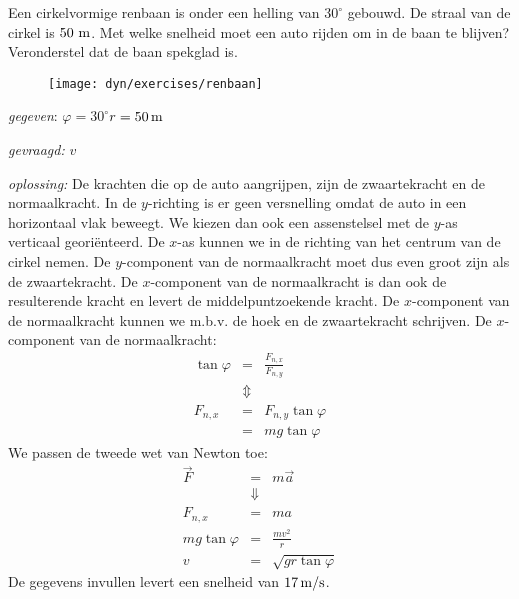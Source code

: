 \documentclass{ximera}
\begin{document}
\begin{exercise} Een cirkelvormige renbaan is onder een helling van $30^\circ$
gebouwd. De straal van de cirkel is $50~\rm m$. Met welke snelheid
moet een auto rijden om in de baan te blijven? Veronderstel dat de
baan spekglad is. 
\begin{oplossing}
\begin{figure}[h]
\centering\texttt{[image: dyn/exercises/renbaan]}
\end{figure}


\textit{gegeven}: $\varphi=30^\circ$\newline$r=50\rm\,m$

\textit{gevraagd:} $v$

\textit{oplossing:} De krachten die op de auto aangrijpen, zijn de zwaartekracht en de normaalkracht. In de $y$-richting is er geen versnelling omdat de auto in een horizontaal vlak beweegt. We kiezen dan ook een assenstelsel met de $y$-as verticaal geori\"enteerd. De $x$-as kunnen we in de richting van het centrum van de cirkel nemen. De $y$-component van de normaalkracht moet dus even groot zijn als de zwaartekracht. De $x$-component van de normaalkracht is dan ook de resulterende kracht en levert de middelpuntzoekende kracht. De $x$-component van de normaalkracht kunnen we m.b.v. de hoek en de zwaartekracht schrijven.
\newline
\newline
De $x$-component van de normaalkracht:
\begin{eqnarray*}
\tan{\varphi}&=&\frac{F_{n,x}}{F_{n,y}}\\
&\Updownarrow&\\
F_{n,x}&=&F_{n,y}\tan{\varphi}\\
&=&mg\tan{\varphi}
\end{eqnarray*}
We passen de tweede wet van Newton toe:
\begin{eqnarray*}
\vec{F}&=&m\vec{a}\\
&\Downarrow&\\
F_{n,x}&=&ma\\
mg\tan{\varphi}&=&\frac{mv^2}{r}\\
v&=&\sqrt{gr\tan{\varphi}}
\end{eqnarray*}
De gegevens invullen levert een snelheid van $17\rm\,m/s$.
\end{oplossing}



\end{exercise}
\end{document}
